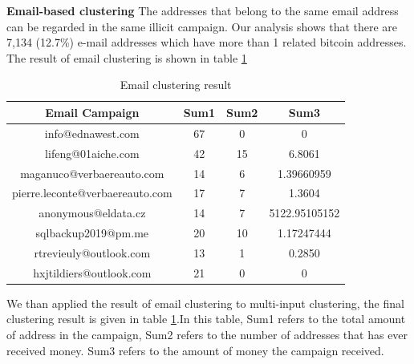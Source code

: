 \noindent{}

\textbf{Email-based clustering} The addresses that belong to the same email address can be regarded in the same illicit campaign. Our analysis shows that there are 7,134 (12.7\%) e-mail addresses which have more than 1 related bitcoin addresses. The result of email clustering is shown in table \ref{table:email-campaign}

\begin{table}[htbp]
\centering
 \caption{Email clustering result\label{table:email-campaign}}
 \begin{tabular}{cccc}
  \toprule
  Email Campaign & Sum1& Sum2 & Sum3 \\
  \midrule
 info@ednawest.com & 67 & 0 & 0\\
 lifeng@01aiche.com & 42 & 15 &6.8061\\
 maganuco@verbaereauto.com & 14 & 6 &1.39660959 \\
  pierre.leconte@verbaereauto.com& 17 & 7 & 1.3604\\
  anonymous@eldata.cz & 14 & 7 &5122.95105152 \\
  sqlbackup2019@pm.me & 20 & 10 & 1.17247444 \\
  rtrevieuly@outlook.com & 13 & 1 & 0.2850\\
   hxjtildiers@outlook.com&21 &0 &0 \\
  
  \bottomrule
 \end{tabular}
\end{table}




We than applied the result of email clustering to multi-input clustering, the final clustering result is given in table \ref{table:email-campaign}.In this table, Sum1 refers to the total amount of address in the campaign, Sum2 refers to the number of addresses that has ever received money. Sum3 refers to the amount of money the campaign received.

